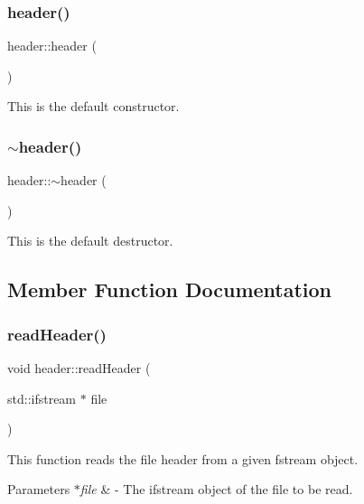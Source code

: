 \subsubsection{\texorpdfstring{header()}{header()}}
{\footnotesize\ttfamily header\+::header (\begin{DoxyParamCaption}{ }\end{DoxyParamCaption})}

This is the default constructor. \mbox{\label{classheader_a66f724a5dec3b403a4079a33b54ce86a}} 
\subsubsection{\texorpdfstring{$\sim$header()}{~header()}}
{\footnotesize\ttfamily header\+::$\sim$header (\begin{DoxyParamCaption}{ }\end{DoxyParamCaption})}

This is the default destructor. 

\subsection{Member Function Documentation}
\mbox{\label{classheader_a36c498b1d044ef1477d198e029c15230}} 
\subsubsection{\texorpdfstring{read\+Header()}{readHeader()}}
{\footnotesize\ttfamily void header\+::read\+Header (\begin{DoxyParamCaption}\item[{std\+::ifstream $\ast$}]{file }\end{DoxyParamCaption})}

This function reads the file header from a given fstream object. 
\begin{DoxyParams}{Parameters}
{\em $\ast$file} & -\/ The ifstream object of the file to be read. \\
\hline
\end{DoxyParams}
\mbox{\label{classheader_ae2875cfe9124d7b710ed107168cc860d}} 
